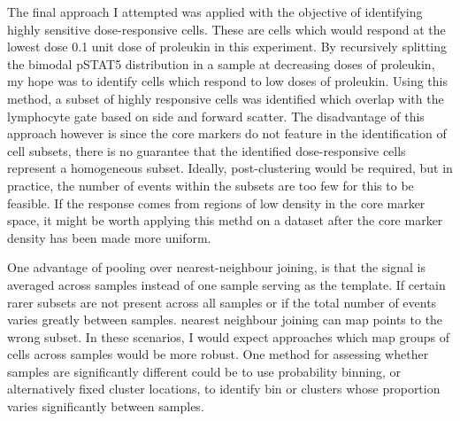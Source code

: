 The final approach I attempted was applied with the objective of identifying highly sensitive dose-responsive cells.
These are cells which would respond at the lowest dose 0.1 unit dose of proleukin in this experiment.
By recursively splitting the bimodal pSTAT5 distribution in a sample at decreasing doses of proleukin,
my hope was to identify cells which respond to low doses of proleukin.
Using this method, a subset of highly responsive cells was identified which overlap with the lymphocyte gate based on side and forward scatter.
The disadvantage of this approach however is since the core markers do not feature in the identification of cell subsets,
there is no guarantee that the identified dose-responsive cells represent a homogeneous subset.
Ideally, post-clustering would be required, but in practice, the number of events within the subsets are too few for this to be feasible.
If the response comes from regions of low density in the core marker space, it might be worth applying this methd on a dataset after the core marker density has been made more uniform.

One advantage of pooling over nearest-neighbour joining, is that the signal is averaged across samples instead of one sample serving as the template.
If certain rarer subsets are not present across all samples or if the total number of events varies greatly between samples.
nearest neighbour joining can map points to the wrong subset.
In these scenarios, I would expect approaches which map groups of cells across samples would be more robust.
One method for assessing whether samples are significantly different could be to use probability binning,
or alternatively fixed cluster locations, to identify bin or clusters whose proportion varies significantly between samples.




